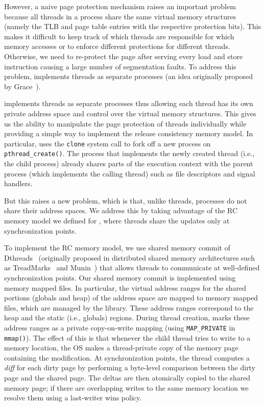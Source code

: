 However, a naive page protection mechanism raises an important problem because all threads in a process share the same virtual memory
structures (namely the TLB and page table entries with the respective protection bits). This makes it difficult to keep track of which
threads are responsible for which memory accesses or to enforce different protections for different threads. Otherwise, we need to re-protect the page after serving every load and store instruction causing a large number of segmentation faults.
To address this problem, \projecttitle implements threads as separate
processes (an idea originally proposed by Grace~\cite{grace-oopsla-2009}).

 \projecttitle  implements threads as separate processes thus allowing each thread has its own private address space and control over the virtual
memory structures.   This gives us the ability to manipulate the page protection of threads individually while providing a simple way to implement the release consistency memory
model. In particular, \projecttitle uses the {\tt clone} system call to fork off a new process on {\tt pthread\_create()}. The process that implements the newly created thread (i.e., the child process) already
shares parts of the execution context with the parent process (which implements the calling thread) such as file descriptors and signal handlers. 


But this raises a new problem, which is that, unlike threads, processes do not share their address spaces. We address this by taking advantage of the RC memory model we defined for \projecttitle, where threads share the updates only at synchronization points.  

 To implement the RC memory model, we use shared memory commit of  Dthreads~\cite{dthreads-sosp-2011} (originally proposed in distributed shared memory architectures such as TreadMarks~\cite{treadmark} and Munin~\cite{munin}) 
that allows threads to communicate at well-defined synchronization points.
Our shared memory commit is implemented using memory mapped files. In
particular, the virtual address ranges for the shared portions (globals and heap) of
the address space are mapped to memory mapped files, which are managed by the
\projecttitle library. These address ranges correspond to the heap and
the static (i.e., globals) regions.  During thread creation,
\projecttitle marks these address ranges as a private copy-on-write
mapping (using {\tt MAP\_PRIVATE} in {\tt mmap()}). The effect of this
is that whenever the child thread tries to write to a memory location,
the OS makes a thread-private copy of the memory page containing the
modification.  At synchronization points, the thread computes a {\em diff}
for each dirty page by performing a byte-level comparison between the
dirty page and the shared page. The deltas are then atomically
copied to the shared memory page; if there are overlapping writes
to the same memory location we resolve them using a last-writer wins policy.


